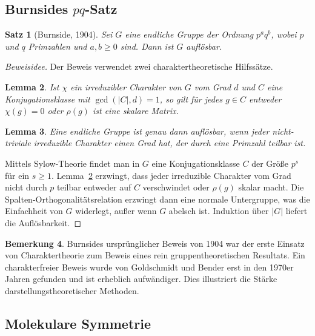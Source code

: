 \documentclass[12pt,a4paper]{amsart}
\newtheorem{theorem}{Satz}[section]
\newtheorem{lemma}[theorem]{Lemma}
\theoremstyle{definition}
\newtheorem{bemerkung}[theorem]{Bemerkung}
\begin{document}
\subsection{Burnsides $pq$-Satz}

\begin{theorem}[Burnside, 1904]
\label{satz:burnside_pq}
Sei $G$ eine endliche Gruppe der Ordnung $p^a q^b$, wobei $p$ und $q$ Primzahlen
und $a, b \geq 0$ sind.  Dann ist $G$ auflösbar.
\end{theorem}

\begin{proof}[Beweisidee]
Der Beweis verwendet zwei charaktertheoretische Hilfssätze.

\begin{lemma}
\label{lem:b1}
Ist $\chi$ ein irreduzibler Charakter von $G$ vom Grad $d$ und $C$ eine
Konjugationsklasse mit $\gcd(|C|, d) = 1$, so gilt für jedes $g \in C$ entweder
$\chi(g) = 0$ oder $\rho(g)$ ist eine skalare Matrix.
\end{lemma}

\begin{lemma}
\label{lem:b2}
Eine endliche Gruppe ist genau dann auflösbar, wenn jeder nicht-triviale
irreduzible Charakter einen Grad hat, der durch eine Primzahl teilbar ist.
\end{lemma}

Mittels Sylow-Theorie findet man in $G$ eine Konjugationsklasse $C$ der Größe
$p^s$ für ein $s \geq 1$.  Lemma~\ref{lem:b1} erzwingt, dass jeder irreduzible
Charakter vom Grad nicht durch $p$ teilbar entweder auf $C$ verschwindet oder
$\rho(g)$ skalar macht.  Die Spalten-Orthogonalitätsrelation erzwingt dann eine
normale Untergruppe, was die Einfachheit von $G$ widerlegt, außer wenn $G$ abelsch
ist.  Induktion über $|G|$ liefert die Auflösbarkeit.
\end{proof}

\begin{bemerkung}
Burnsides ursprünglicher Beweis von 1904 war der erste Einsatz von Charaktertheorie
zum Beweis eines rein gruppentheoretischen Resultats.  Ein charakterfreier Beweis
wurde von Goldschmidt und Bender erst in den 1970er Jahren gefunden und ist
erheblich aufwändiger.  Dies illustriert die Stärke darstellungstheoretischer
Methoden.
\end{bemerkung}

\subsection{Molekulare Symmetrie}
\end{document}
